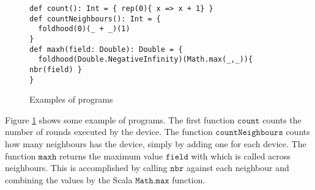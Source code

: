 \begin{figure}[t]
\begin{lstlisting}[language={scafi},frame=single,emph={count, maxh}]
def count(): Int = { rep(0){ x => x + 1} }
def countNeighbours(): Int = {
  foldhood(0)(_ + _)(1)
}
def maxh(field: Double): Double = { 
  foldhood(Double.NegativeInfinity)(Math.max(_,_)){ nbr(field) } 
}
\end{lstlisting}
\caption{Examples of \Scafi{} programs}\label{fig:scafiexample}
\end{figure}

Figure \ref{fig:scafiexample} shows some example of \Scafi{} programs. The first function $\mathtt{count}$ counts the number of rounds executed by the device. The function $\mathtt{countNeighbours}$ counts how many neighbours has the device, simply by adding one for each device. The function $\mathtt{maxh}$ returns the maximum value $\mathtt{field}$ with which is called across neighbours. This is accomplished by calling $\mathtt{nbr}$ against each neighbour and combining the values by the Scala $\mathtt{Math.max}$ function.